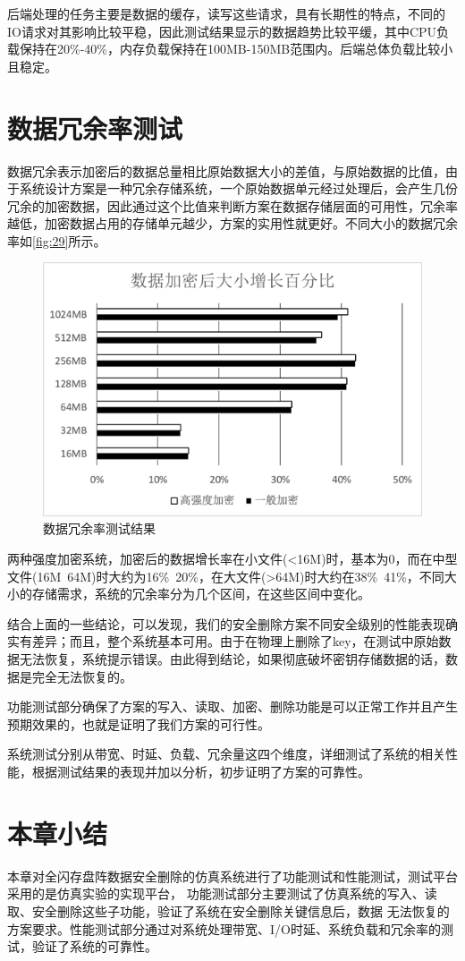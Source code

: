 后端处理的任务主要是数据的缓存，读写这些请求，具有长期性的特点，不同的IO请求对其影响比较平稳，因此测试结果显示的数据趋势比较平缓，其中CPU负载保持在20\%-40\%，内存负载保持在100MB-150MB范围内。后端总体负载比较小且稳定。
\section{数据冗余率测试}
数据冗余表示加密后的数据总量相比原始数据大小的差值，与原始数据的比值，由于系统设计方案是一种冗余存储系统，一个原始数据单元经过处理后，会产生几份冗余的加密数据，因此通过这个比值来判断方案在数据存储层面的可用性，冗余率越低，加密数据占用的存储单元越少，方案的实用性就更好。不同大小的数据冗余率如\autoref{fig:29}所示。
\begin{figure}[H]
	\centering
	\includegraphics[width=1\textwidth]{Pics/data-ry.png}
	\caption{数据冗余率测试结果}
	\label{fig:29}
\end{figure}
两种强度加密系统，加密后的数据增长率在小文件(<16M)时，基本为0，而在中型文件(16M~64M)时大约为16\%~20\%，在大文件(>64M)时大约在38\%~41\%，不同大小的存储需求，系统的冗余率分为几个区间，在这些区间中变化。


结合上面的一些结论，可以发现，我们的安全删除方案不同安全级别的性能表现确实有差异；而且，整个系统基本可用。由于在物理上删除了key，在测试中原始数据无法恢复，系统提示错误。由此得到结论，如果彻底破坏密钥存储数据的话，数据是完全无法恢复的。


功能测试部分确保了方案的写入、读取、加密、删除功能是可以正常工作并且产生预期效果的，也就是证明了我们方案的可行性。


系统测试分别从带宽、时延、负载、冗余量这四个维度，详细测试了系统的相关性能，根据测试结果的表现并加以分析，初步证明了方案的可靠性。

\section{本章小结}
本章对全闪存盘阵数据安全删除的仿真系统进行了功能测试和性能测试，测试平台采用的是仿真实验的实现平台，
功能测试部分主要测试了仿真系统的写入、读取、安全删除这些子功能，验证了系统在安全删除关键信息后，数据
无法恢复的方案要求。性能测试部分通过对系统处理带宽、I/O时延、系统负载和冗余率的测试，验证了系统的可靠性。
